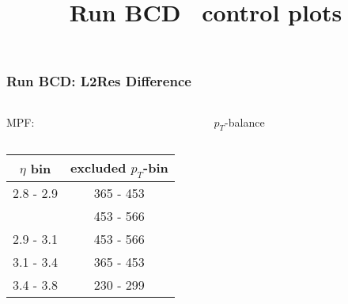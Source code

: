 \documentclass[t,compress]{beamer}
\begin{document}
\begin{frame}
\frametitle{Run BCD: L2Res Difference}
\vspace{-0.4cm}
\begin{columns}
 \begin{column}{0.5\textwidth}
 \vspace{-0.4cm}
 MPF:
  \begin{figure}
\end{figure}
 \end{column}
\begin{column}{0.5\textwidth}
$p_T$-balance
\vspace{-0.4cm}
\begin{figure}
\end{figure}
 \end{column}
 \end{columns}
 \end{frame}
  
  \begin{frame}
\vspace{1cm}
\begin{center}
\begin{tabular}{|c|c|}
 $\eta$ bin  & excluded $p_T$-bin \\ \hline \hline
 2.8 - 2.9 & 365 - 453 \\
           & 453 - 566 \\
 2.9 - 3.1 & 453 - 566 \\
 3.1 - 3.4 & 365 - 453 \\
 3.4 - 3.8 & 230 - 299 \\
\end{tabular}
\end{center}
\end{frame}
  

\title{Run BCD \newline \ control plots}
\author{}
\institute{}
\date{}

\begin{frame}
\maketitle
\end{frame}
\end{document}
